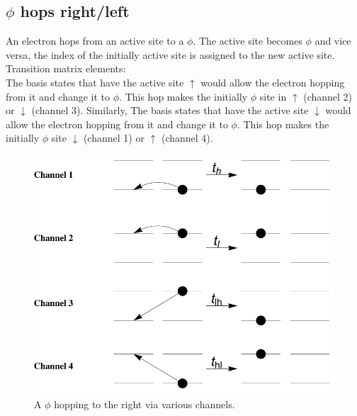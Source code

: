 \documentclass[a4paper,twocolumn]{revtex4-1} %
\newcommand{\da}{\downarrow}
\newcommand{\ua}{\uparrow}
\begin{document}
\subsection{$\phi$ hops right/left}
An electron hops from an active site to a $\phi$.
The active site becomes $\phi$ and vice versa, the index of the initially active site is assigned to the new active site. 
\\Transition matrix elements:\\
The basis states that have the active site $\ua$ would allow 
the electron hopping from it and change it to $\phi$.
This hop makes the initially $\phi$ site in $\ua$ (channel 2) or $\da$  (channel 3).
Similarly,
The basis states that have the active site $\da$ would allow 
the electron hopping from it and change it to $\phi$.
This hop makes the initially $\phi$ site $\da$ (channel 1) or $\ua$  (channel 4).

\begin{figure}[htpb]
  \centering
  \includegraphics[width=0.4\columnwidth]{PhihopsR}
  \caption{A $\phi$ hopping to the right via various channels.
 \label{fig:phihops}}  
\end{figure}
\end{document}
